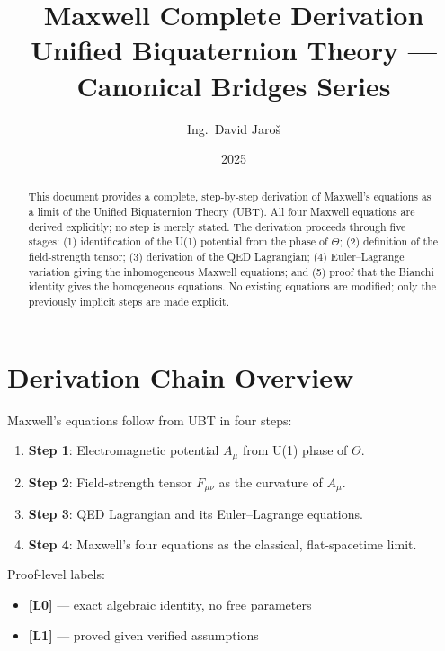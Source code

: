 \documentclass[11pt,a4paper]{article}
\title{Maxwell Complete Derivation\\
\large Unified Biquaternion Theory — Canonical Bridges Series}
\author{Ing.\ David Jaroš}
\date{2025}
\newcommand{\Lzero}{\textbf{[L0]}}
\newcommand{\Lone}{\textbf{[L1]}}
\begin{document}
\maketitle

\begin{abstract}
This document provides a complete, step-by-step derivation of Maxwell's
equations as a limit of the Unified Biquaternion Theory (UBT).
All four Maxwell equations are derived explicitly; no step is merely stated.
The derivation proceeds through five stages: (1) identification of the U(1)
potential from the phase of $\Theta$; (2) definition of the field-strength
tensor; (3) derivation of the QED Lagrangian; (4) Euler--Lagrange variation
giving the inhomogeneous Maxwell equations; and (5) proof that the Bianchi
identity gives the homogeneous equations.
No existing equations are modified; only the previously implicit steps are
made explicit.
\end{abstract}

\tableofcontents
\newpage

\section{Derivation Chain Overview}

Maxwell's equations follow from UBT in four steps:
\begin{enumerate}
  \item \textbf{Step 1}: Electromagnetic potential $A_\mu$ from U(1) phase of $\Theta$.
  \item \textbf{Step 2}: Field-strength tensor $F_{\mu\nu}$ as the curvature of $A_\mu$.
  \item \textbf{Step 3}: QED Lagrangian and its Euler--Lagrange equations.
  \item \textbf{Step 4}: Maxwell's four equations as the classical, flat-spacetime
        limit.
\end{enumerate}

\medskip

\noindent Proof-level labels:
\begin{itemize}
  \item \Lzero{} — exact algebraic identity, no free parameters
  \item \Lone{} — proved given verified assumptions
\end{itemize}

\end{document}
